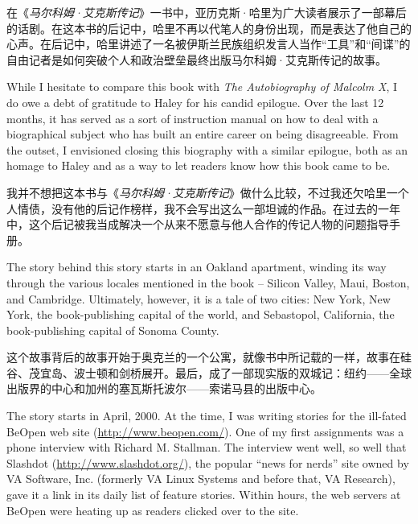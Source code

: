 \ifdefined\chs
在《\textit{马尔科姆·艾克斯传记}》一书中，亚历克斯·哈里为广大读者展示了一部幕后的话剧。在这本书的后记中，哈里不再以代笔人的身份出现，而是表达了他自己的心声。在后记中，哈里讲述了一名被伊斯兰民族组织发言人当作“工具”和“间谍”的自由记者是如何突破个人和政治壁垒最终出版马尔科姆·艾克斯传记的故事。
\fi

\ifdefined\eng
While I hesitate to compare this book with \textit{The Autobiography of Malcolm X}, I do owe a debt of gratitude to Haley for his candid epilogue. Over the last 12 months, it has served as a sort of instruction manual on how to deal with a biographical subject who has built an entire career on being disagreeable. %
From the outset, I envisioned closing this biography with a similar epilogue, both as an homage to Haley and as a way to let readers know how this book came to be.
\fi

\ifdefined\chs
我并不想把这本书与《\textit{马尔科姆·艾克斯传记}》做什么比较，不过我还欠哈里一个人情债，没有他的后记作榜样，我不会写出这么一部坦诚的作品。在过去的一年中，这个后记被我当成解决一个从来不愿意与他人合作的传记人物的问题指导手册。%
\fi

\ifdefined\eng
The story behind this story starts in an Oakland apartment, winding its way through the various locales mentioned in the book -- Silicon Valley, Maui, Boston, and Cambridge. Ultimately, however, it is a tale of two cities: New York, New York, the book-publishing capital of the world, and Sebastopol, California, the book-publishing capital of Sonoma County.
\fi

\ifdefined\chs
这个故事背后的故事开始于奥克兰的一个公寓，就像书中所记载的一样，故事在硅谷、茂宜岛、波士顿和剑桥展开。最后，成了一部现实版的双城记：纽约——全球出版界的中心和加州的塞瓦斯托波尔——索诺马县的出版中心。
\fi

\ifdefined\eng
The story starts in April, 2000. At the time, I was writing stories for the ill-fated BeOpen web site (\url{http://www.beopen.com/}). One of my first assignments was a phone interview with Richard M. Stallman. The interview went well, so well that Slashdot (\url{http://www.slashdot.org/}), the popular ``news for nerds'' site owned by VA Software, Inc. (formerly VA Linux Systems and before that, VA Research), gave it a link in its daily list of feature stories. Within hours, the web servers at BeOpen were heating up as readers clicked over to the site.
\fi


